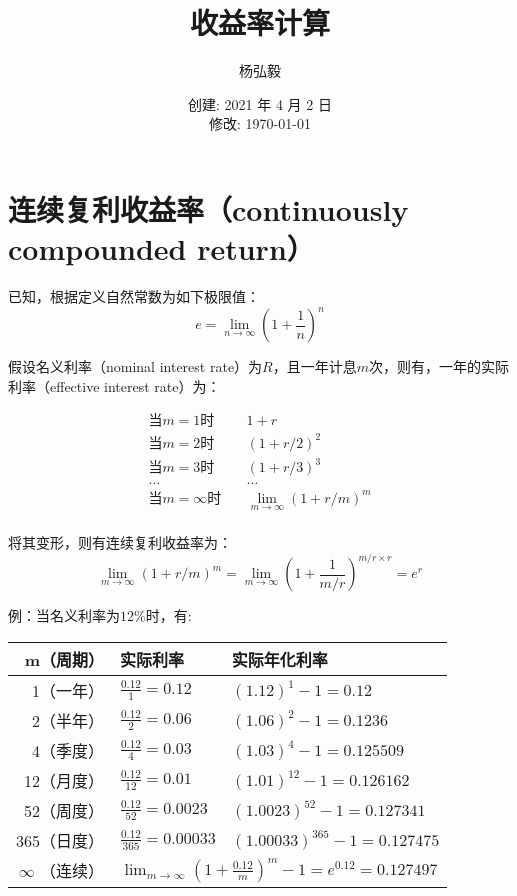 \documentclass[11pt]{article}
\title{收益率计算}
\author{杨弘毅}
\date{创建: 2021 年 4 月 2 日 \\修改: \today}
\begin{document}
\maketitle

\section{连续复利收益率（continuously compounded return）}

已知，根据定义自然常数为如下极限值：
\begin{equation*}
    e = \lim_{n \rightarrow \infty} \left(1+ \frac{1}{n}\right)^n
\end{equation*}

假设名义利率（nominal interest rate）为$R$，且一年计息$m$次，则有，一年的实际利率（effective interest rate）为：

\begin{equation*}
    \begin{aligned}
        \text{当$m=1$时} &\quad 1+r \\
        \text{当$m=2$时} &\quad (1+r/2)^2 \\
        \text{当$m=3$时} &\quad (1+r/3)^3 \\
        \dots &\quad \dots \\
        \text{当$m=\infty$时} &\quad \lim_{m \rightarrow \infty} (1+r/m)^m \\
    \end{aligned}
\end{equation*}

将其变形，则有连续复利收益率为：
\begin{equation*}
    \lim_{m \rightarrow \infty} (1+r/m)^m = 
    \lim_{m \rightarrow \infty} (1+\frac{1}{m/r})^{m/r\times r} = e^r
\end{equation*}

例：当名义利率为$12\%$时，有:
\begin{table}[H]
\centering
\begin{tabular}{@{}rll@{}}
\toprule
m（周期）  & 实际利率              & 实际年化利率 \\ \midrule
1（一年）   & $\frac{0.12}{1}=0.12$  & $(1.12)^1-1=0.12$ \\
2（半年）   & $\frac{0.12}{2}=0.06$  & $(1.06)^2-1=0.1236$      \\
4（季度）   & $\frac{0.12}{4}=0.03$  & $(1.03)^4-1=0.125509$       \\
12（月度）  & $\frac{0.12}{12}=0.01$ & $(1.01)^{12}-1=0.126162$ \\
52（周度）  & $\frac{0.12}{52}=0.0023$  & $(1.0023)^{52}-1=0.127341$\\
365（日度） & $\frac{0.12}{365}=0.00033$ & $(1.00033)^365-1=0.127475$ \\
$\infty$ （连续）  & \multicolumn{2}{l}{$ \lim_{m \rightarrow \infty} (1+\frac{0.12}{m})^{m} - 1 = e^{0.12} = 0.127497
$}            \\ \bottomrule
\end{tabular}
\end{table}
\end{document}

